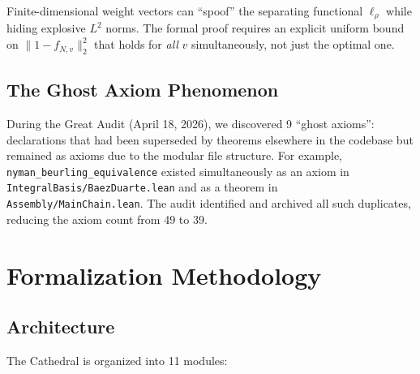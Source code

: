 \documentclass[11pt,a4paper]{article}
\theoremstyle{plain}
\theoremstyle{definition}
\theoremstyle{remark}
\newcommand{\lean}[1]{\texttt{#1}}
\begin{document}
Finite-dimensional weight vectors can ``spoof'' the separating
functional $\ell_\rho$ while hiding explosive $L^2$ norms. The formal
proof requires an explicit uniform bound on $\|1 - f_{N,v}\|_2^2$
that holds for \emph{all} $v$ simultaneously, not just the optimal one.

\subsection{The Ghost Axiom Phenomenon}

During the Great Audit (April 18, 2026), we discovered 9 ``ghost axioms'':
declarations that had been superseded by theorems elsewhere in the codebase
but remained as axioms due to the modular file structure. For example,
\lean{nyman\_beurling\_equivalence} existed simultaneously as an axiom in
\lean{IntegralBasis/BaezDuarte.lean} and as a theorem in
\lean{Assembly/MainChain.lean}. The audit identified and archived all
such duplicates, reducing the axiom count from 49 to 39.

\section{Formalization Methodology}
\label{sec:methodology}

\subsection{Architecture}

The Cathedral is organized into 11 modules:
\end{document}
